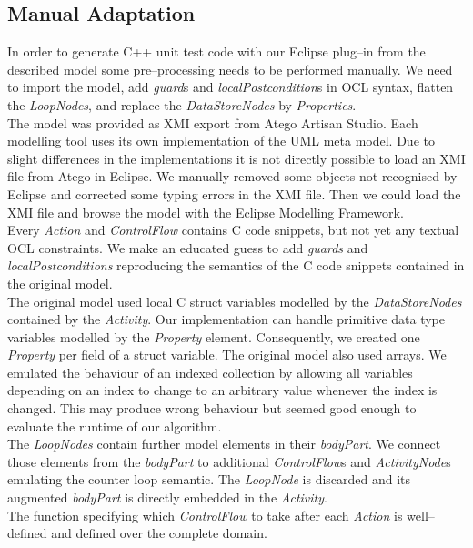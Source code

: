 \documentclass[runningheads,a4paper]{llncs}%
\newcommand{\UMLType}[1]{\textsf{\textit{#1}}} %
\newcommand{\UMLReference}[1]{\textsf{\textit{#1}}} %
\begin{document}
\subsection{Manual Adaptation}%
In order to generate C++ unit test code with our Eclipse plug--in from the described model some pre--processing needs to be performed manually. We need to import the model, add \UMLReference{guard}s and \UMLReference{localPostcondition}s in OCL syntax, flatten the \UMLType{LoopNodes}, and replace the \UMLType{DataStoreNodes} by \UMLType{Properties}.\\%
The model was provided as XMI export from Atego\textsuperscript{\textregistered} Artisan Studio. Each modelling tool uses its own implementation of the UML meta model. Due to slight differences in the implementations it is not directly %
possible to load an XMI file from Atego\textsuperscript{\textregistered} in Eclipse. We manually removed some objects not recognised by Eclipse and corrected some typing errors in the XMI file. Then we could load the XMI file and browse the model with the Eclipse Modelling Framework.\\%
Every \UMLType{Action} and \UMLReference{ControlFlow} contains C code snippets, but not yet any textual OCL constraints. We make an educated guess to add \UMLReference{guards} and \UMLReference{localPostconditions} reproducing the semantics of the C code snippets contained in the original model.\\%
The original model used local C struct variables modelled by the \UMLType{DataStoreNodes} contained by the \UMLType{Activity}. Our implementation can handle primitive data type variables modelled by the \UMLType{Property} element. Consequently, we created one \UMLType{Property} per field of a struct variable. The original model also used arrays. We emulated the behaviour of an indexed collection by allowing all variables depending on an index to change to an arbitrary value whenever the index is changed. This may produce wrong behaviour but seemed good %
enough to evaluate the runtime of our algorithm.\\
The \UMLType{LoopNodes} contain further model elements in their \UMLReference{bodyPart}. We connect those elements from the \UMLReference{bodyPart} to additional \UMLType{ControlFlow}s and \UMLType{ActivityNode}s emulating the counter loop semantic. The \UMLType{LoopNode} is discarded and its augmented \UMLReference{bodyPart} is directly embedded in the \UMLType{Activity}.%
\\%
The function specifying which \UMLType{ControlFlow} to take after each \UMLType{Action} is well--defined and defined over the complete domain.%
\end{document}
